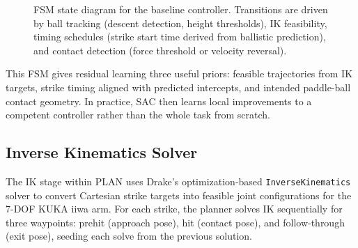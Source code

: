 \documentclass[10pt,twocolumn,letterpaper]{article}
\begin{document}
\begin{figure}[t]
\centering
{}
\caption{FSM state diagram for the baseline controller. Transitions are driven by ball tracking (descent detection, height thresholds), IK feasibility, timing schedules (strike start time derived from ballistic prediction), and contact detection (force threshold or velocity reversal).}
\label{fig:fsm_diagram}
\end{figure}

This FSM gives residual learning three useful priors: feasible trajectories from IK targets, strike timing aligned with predicted intercepts, and intended paddle-ball contact geometry. In practice, SAC then learns local improvements to a competent controller rather than the whole task from scratch.

\subsection{Inverse Kinematics Solver}
The IK stage within PLAN uses Drake's optimization-based \texttt{InverseKinematics} solver to convert Cartesian strike targets into feasible joint configurations for the 7-DOF KUKA iiwa arm. For each strike, the planner solves IK sequentially for three waypoints: prehit (approach pose), hit (contact pose), and follow-through (exit pose), seeding each solve from the previous solution.
\end{document}
